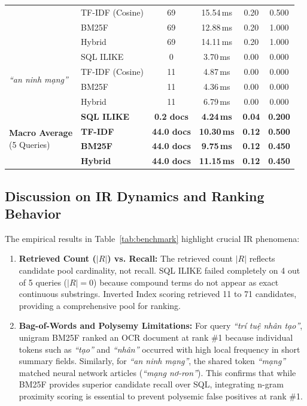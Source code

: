 \documentclass[conference]{IEEEtran}
\begin{document}
\begin{table}[htbp]
{\begin{tabular}{llcccc}
 & TF-IDF (Cosine) & 69 & 15.54\,ms & 0.20 & 0.500 \\
 & BM25F & 69 & 12.88\,ms & 0.20 & 1.000 \\
 & Hybrid & 69 & 14.11\,ms & 0.20 & 1.000 \\
\midrule
\multirow{4}{*}{\textit{``an ninh mạng''}} 
 & SQL ILIKE & 0 & 3.70\,ms & 0.00 & 0.000 \\
 & TF-IDF (Cosine) & 11 & 4.87\,ms & 0.00 & 0.000 \\
 & BM25F & 11 & 4.36\,ms & 0.00 & 0.000 \\
 & Hybrid & 11 & 6.79\,ms & 0.00 & 0.000 \\
\midrule
\multirow{4}{*}{\parbox{2.2cm}{\textbf{Macro Average}\\ \scriptsize(5 Queries)}} 
 & \textbf{SQL ILIKE} & \textbf{0.2 docs} & \textbf{4.24\,ms} & \textbf{0.04} & \textbf{0.200} \\
 & \textbf{TF-IDF} & \textbf{44.0 docs} & \textbf{10.30\,ms} & \textbf{0.12} & \textbf{0.500} \\
 & \textbf{BM25F} & \textbf{44.0 docs} & \textbf{9.75\,ms} & \textbf{0.12} & \textbf{0.450} \\
 & \textbf{Hybrid} & \textbf{44.0 docs} & \textbf{11.15\,ms} & \textbf{0.12} & \textbf{0.450} \\
\bottomrule
\end{tabular}%
}
\end{table}

\subsection{Discussion on IR Dynamics and Ranking Behavior}
The empirical results in Table~\ref{tab:benchmark} highlight crucial IR phenomena:
\begin{enumerate}
    \item \textbf{Retrieved Count ($|R|$) vs. Recall:} The retrieved count $|R|$ reflects candidate pool cardinality, not recall. SQL ILIKE failed completely on 4 out of 5 queries ($|R|=0$) because compound terms do not appear as exact continuous substrings. Inverted Index scoring retrieved 11 to 71 candidates, providing a comprehensive pool for ranking.
    \item \textbf{Bag-of-Words and Polysemy Limitations:} For query \textit{``trí tuệ nhân tạo''}, unigram BM25F ranked an OCR document at rank \#1 because individual tokens such as \textit{``tạo''} and \textit{``nhân''} occurred with high local frequency in short summary fields. Similarly, for \textit{``an ninh mạng''}, the shared token \textit{``mạng''} matched neural network articles (\textit{``mạng nơ-ron''}). This confirms that while BM25F provides superior candidate recall over SQL, integrating n-gram proximity scoring is essential to prevent polysemic false positives at rank \#1.
\end{enumerate}
\end{document}
